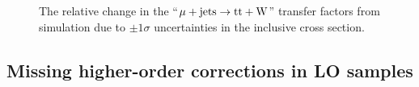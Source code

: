 \begin{figure}[!h]
{  } \\
   ~
   \\
  \caption{\label{fig:tfSyst_ttbarxs_muToTtw} The relative change in the
    ``$\mu + \textrm{jets} \rightarrow \mathrm{tt+W}$'' transfer factors from
    simulation due to $\pm1\sigma$ uncertainties in the \ttbar
    inclusive cross section.  }
\end{figure}

\clearpage
\subsection{Missing higher-order corrections in LO \texorpdfstring{\MADGRAPH}{MadGraph}
  samples}

